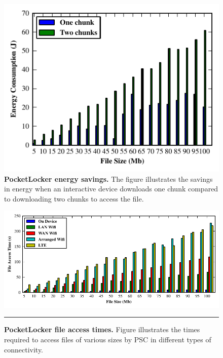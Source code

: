 \begin{figure}[t]
  
  \includegraphics{./figures/energysavings.pdf}
  
  \caption{\small \textbf{PocketLocker energy savings.} The figure
    illustrates the savings in energy when an interactive device downloads
  one chunk compared to downloading two chunks to access the file.}
  
  \label{fig-evaluation-energysavings}

\end{figure}


\begin{figure}[t]
  \centering
  \includegraphics{./figures/downloadtimes.pdf}
  
  \vspace*{-0.1in}

  \caption{\small \textbf{PocketLocker file access times.} Figure
    illustrates the
    times required to access files of various sizes by PSC in different
    types of
  connectivity.}

  \label{fig-evaluation-download}
  
  \vspace*{0.05in}

  \hrule

  \vspace*{-0.2in}

\end{figure}

